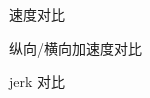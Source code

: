 \begin{subfigure}[b]{\textwidth}
  \centering
  
  \caption{速度对比}
\end{subfigure}

\begin{subfigure}[b]{\textwidth}
  \centering
  
  \caption{纵向/横向加速度对比}
\end{subfigure}

\begin{subfigure}[b]{\textwidth}
  \centering
  
  \caption{jerk 对比}
\end{subfigure}

